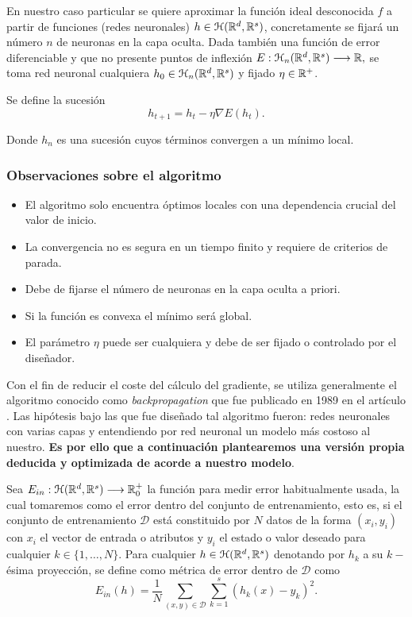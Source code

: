 En nuestro caso particular se quiere aproximar la función ideal desconocida $f$ a partir de funciones (redes neuronales) $h \in \mathcal{H}(\mathbb{R}^d,\mathbb{R}^s)$, concretamente se fijará un número $n$ de neuronas en la capa oculta. 
Dada también una función de error diferenciable y que no presente puntos de inflexión
$E: \mathcal{H}_n(\mathbb{R}^d,\mathbb{R}^s)\longrightarrow \mathbb{R},$
se toma red neuronal cualquiera $h_0 \in \mathcal{H}_n(\mathbb{R}^d,\mathbb{R}^s)$ y 
fijado $\eta \in \mathbb{R}^+$. 

Se define la sucesión 
\begin{equation}\label{eq:descenso-gradiente}
    h_{t+1}  = h_t - \eta \nabla E(h_t).
\end{equation}  

Donde $h_n$ es una sucesión cuyos términos convergen a un mínimo local.
\subsubsection*{Observaciones sobre el algoritmo }

\begin{itemize}
    \item El algoritmo solo encuentra óptimos locales con una dependencia crucial del valor de inicio. 
    \item La convergencia no es segura en un tiempo finito y requiere de criterios de parada. 
    \item Debe de fijarse el número de neuronas en la capa oculta a priori.
    \item Si la función es convexa el mínimo será global.
    \item El parámetro $\eta$ puede ser cualquiera y debe de ser fijado o controlado por el diseñador.  
\end{itemize}


Con el fin de reducir el coste del cálculo del gradiente, 
se utiliza generalmente el algoritmo conocido como \textit{backpropagation} que fue publicado en 
1989 en el artículo \cite{backpropagation-Hinton}. Las hipótesis bajo las que fue diseñado tal algoritmo fueron: redes neuronales con varias capas y entendiendo por red neuronal un modelo más costoso al nuestro. \textbf{Es por ello que a continuación plantearemos una versión propia deducida y optimizada de acorde a nuestro modelo}.

 Sea $E_{in} : \mathcal{H}(\mathbb{R}^d,\mathbb{R}^s) \longrightarrow \mathbb{R}^+_0$ la función para medir error habitualmente usada, la cual tomaremos como el error dentro del conjunto de entrenamiento, esto es,  si el conjunto 
de entrenamiento $\mathcal{D}$ está constituido por $N$ datos de la forma $(x_i, y_i)$ con $x_i$ el vector de entrada o atributos y $y_i$ el estado o valor deseado para cualquier $k\in \{1, \ldots, N\}.$ Para cualquier $h \in \mathcal{H}(\mathbb{R}^d,\mathbb{R}^s)$ denotando por $h_k$ a su $k-$ésima proyección, se define como métrica de error dentro de $\mathcal{D}$ como
\begin{equation}
    E_{in}(h) = \frac{1}{N} \sum_{(x,y) \in \mathcal{D}} \sum_{k=1}^s(h_k(x)- y_k)^2. 
\end{equation}

